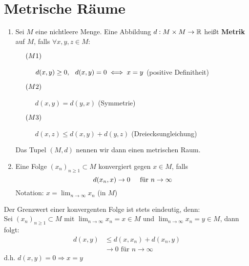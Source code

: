
\chapter{Metrische R{\"a}ume}

\begin{definition} 
	\begin{enumerate}[label=\alph*\upshape)]
		\item 	Sei $M$ eine nichtleere Menge. Eine Abbildung $d: M \times M \rightarrow 		\mathbb{R}$ hei{\ss}t \textbf{Metrik} auf $M$, falls $\forall x, y, z \in M:$
			\begin{description}
				\item[$\hspace{0.5cm} (M1) \hspace{0.1cm} $] $d(x, y) \geq 0, \hspace{0.25cm} d(x, y) = 0 \iff x = y $  (positive Definitheit)
				\item[$\hspace{0.5cm} (M2) \hspace{0.1cm} $] $d(x, y) = d(y, x)$  (Symmetrie)
				\item[$\hspace{0.5cm} (M3) \hspace{0.1cm} $] $d(x, z) \leq d(x, y) + d(y, z)$  (Dreiecksungleichung)
			\end{description}
			Das Tupel $(M, d)$ nennen wir dann einen metrischen Raum. 
		\item Eine Folge $(x_{n})_{n \geq 1} \subset M$ konvergiert gegen $x \in M$, falls
			\[ d(x_{n}, x) \rightarrow 0 \hspace{0.5cm} \text{für } n \rightarrow \infty \]	 
			Notation: $x = \lim_{n \rightarrow \infty} x_{n}$ (in $M$)
	\end{enumerate}
\end{definition}

\begin{bemerkung*}
Der Grenzwert einer konvergenten Folge ist stets eindeutig, denn: \\
Sei $(x_{n})_{n \geq  1} \subset M$ mit $\lim_{n \rightarrow \infty} x_{n} = x \in M$ und $\lim_{n \rightarrow \infty} x_{n} = y \in M$, dann folgt: 
	\begin{align*}
		d(x, y) & \leq d(x, x_{n}) + d(x_{n}, y) \\
				& \rightarrow 0 \text{ für } n \rightarrow \infty
	\end{align*}
	d.h. $d(x, y) = 0 \Rightarrow x = y$
\end{bemerkung*}

